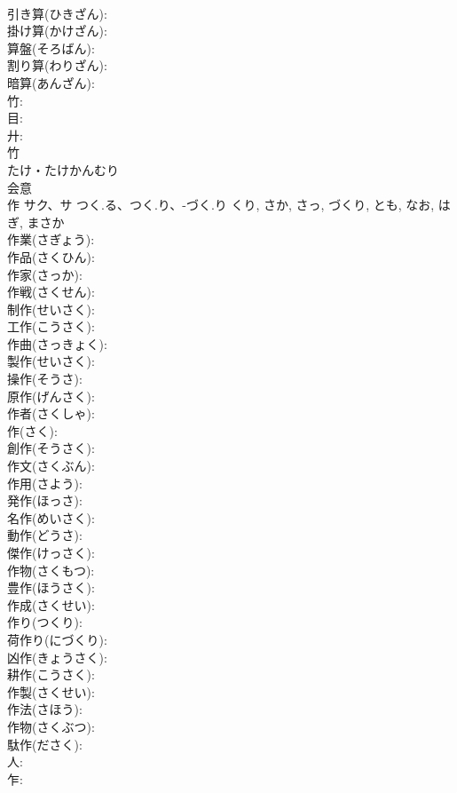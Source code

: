 \documentclass[8pt]{extreport}
\begin{document}
\begin{CJK}{UTF8}{min}
\\	引き算(ひきざん): 
\\	掛け算(かけざん): 
\\	算盤(そろばん): 
\\	割り算(わりざん): 
\\	暗算(あんざん): 
\\	竹: 
\\	目: 
\\	廾: 
\\	竹	
\\	たけ・たけかんむり	
\\	会意 
\\	作	サク、サ	つく.る、つく.り、-づく.り	くり, さか, さっ, づくり, とも, なお, はぎ, まさか	
\\	作業(さぎょう): 
\\	作品(さくひん): 
\\	作家(さっか): 
\\	作戦(さくせん): 
\\	制作(せいさく): 
\\	工作(こうさく): 
\\	作曲(さっきょく): 
\\	製作(せいさく): 
\\	操作(そうさ): 
\\	原作(げんさく): 
\\	作者(さくしゃ): 
\\	作(さく): 
\\	創作(そうさく): 
\\	作文(さくぶん): 
\\	作用(さよう): 
\\	発作(ほっさ): 
\\	名作(めいさく): 
\\	動作(どうさ): 
\\	傑作(けっさく): 
\\	作物(さくもつ): 
\\	豊作(ほうさく): 
\\	作成(さくせい): 
\\	作り(つくり): 
\\	荷作り(にづくり): 
\\	凶作(きょうさく): 
\\	耕作(こうさく): 
\\	作製(さくせい): 
\\	作法(さほう): 
\\	作物(さくぶつ): 
\\	駄作(ださく): 
\\	人: 
\\	乍: 

\end{CJK}
\end{document}
